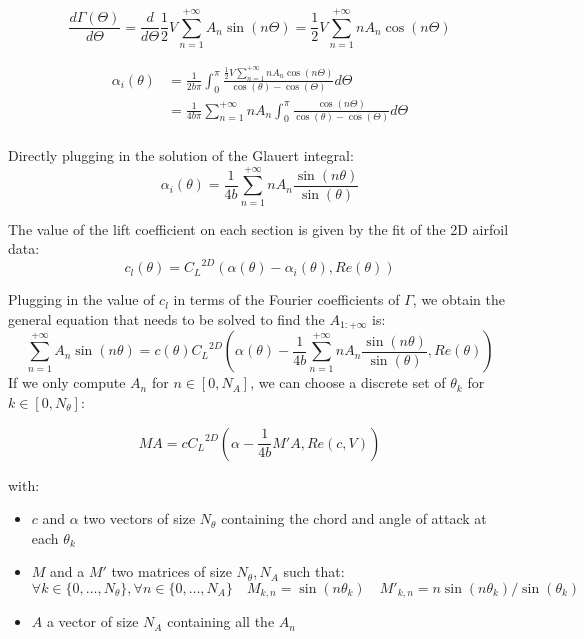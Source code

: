 \documentclass[letterpaper,12pt]{article}
\begin{document}
$$\frac{d\Gamma(\Theta)}{d\Theta} = \frac{d}{d\Theta}\frac12 V\sum_{n=1}^{+\infty} A_n \sin(n\Theta)  = \frac{1}{2} V\sum_{n=1}^{+\infty} n A_n \cos(n\Theta) $$

\begin{align*}
	\alpha_i(\theta) &= \frac{1}{2b\pi }  \int_{0}^{\pi} \frac{ \frac{1}{2} V\sum_{n=1}^{+\infty} n A_n \cos(n\Theta) }{\cos(\theta)-\cos(\Theta)} d\Theta	\\
				&= \frac{1}{4b\pi }  \sum_{n=1}^{+\infty} n A_n \int_{0}^{\pi} \frac{ \cos(n\Theta) }{\cos(\theta)-\cos(\Theta)} d\Theta	\\
\end{align*}

Directly plugging in the solution of the Glauert integral:
$$ \alpha_i(\theta) = \frac {1}{4b}  \sum_{n=1}^{+\infty} n A_n \frac{ \sin(n\theta) }{\sin(\theta)} 	$$

The value of the lift coefficient on each section is given by the fit of the 2D airfoil data:
$$c_l(\theta) = {C_L}^{2D} \left( \alpha(\theta) - \alpha_i(\theta), Re(\theta)\right)$$

Plugging in the value of $c_l$ in terms of the Fourier coefficients of $\Gamma$,
we obtain the general equation that needs to be solved to find the $A_{1:+\infty}$ is:
%
$$
\sum_{n=1}^{+\infty} A_n \sin(n\theta) = c(\theta) {C_L}^{2D} \left( \alpha(\theta) - \frac {1}{4b}  \sum_{n=1}^{+\infty} n A_n \frac{ \sin(n\theta) }{\sin(\theta)} , Re(\theta)\right)
$$
%
If we only compute $A_{n}$ for $n \in [0, N_A]$, we can choose a discrete set of $\theta_k$ for $k \in [0, N_{\theta}]$:

\begin{equation}
	MA = c {C_L}^{2D} \left( \alpha - \frac {1}{4b} M' A , Re(c, V)\right) 
\end{equation}

with:
\begin{itemize}
	\item[] $c$ and $\alpha$ two vectors of size $N_{\theta}$ containing the chord and angle of attack at each $\theta_k$
	\item[] $M$ and a $M'$ two matrices of size $N_{\theta}, N_A$ such that: 
	$$ \forall k\in \{0,\dots, N_{\theta}\}, \forall n \in \{0,\dots, N_A\} \quad M_{k,n} = \sin(n\theta_k) \quad {M'}_{k,n} = n\sin(n\theta_k)/\sin(\theta_k)$$
	\item[] $A$ a vector of size $N_A$ containing all the $A_n$
\end{itemize}
\end{document}
